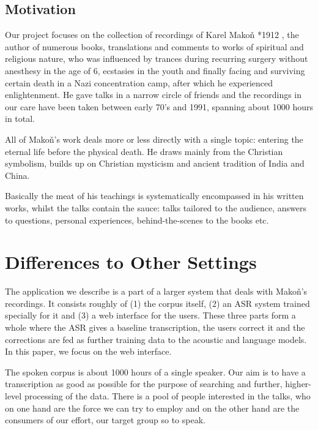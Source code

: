 \documentclass{svproc}
\begin{document}
\subsection{Motivation}

Our project focuses on the collection of recordings of Karel
Mako\v{n}\cite{hajek2007cesky} *1912 , the author of numerous
books, translations and comments to works of spiritual and religious nature, who
was influenced by trances during recurring surgery without anesthesy in the age
of 6, ecstasies in the youth and finally facing and surviving certain death in a
Nazi concentration camp, after which he experienced enlightenment. He gave talks
in a narrow circle of friends and the recordings in our care have been taken
between early 70's and 1991, spanning about 1000 hours in total.

All of Mako\v{n}'s work deals more or less directly with a single topic:
entering the eternal life before the physical death. He draws mainly from the
Christian symbolism, builds up on Christian mysticism and ancient tradition of
India and China.

Basically the meat of his teachings is systematically encompassed in his written
works, whilst the talks contain the sauce: talks tailored to the audience,
answers to questions, personal experiences, behind-the-scenes to the books etc.

\section{Differences to Other Settings}


The application we describe is a part of a larger system that deals with
Mako\v{n}'s recordings. It consists roughly of (1) the corpus itself, (2) an ASR
system trained specially for it and (3) a web interface for the users. These
three parts form a whole where the ASR gives a baseline transcription, the users
correct it and the corrections are fed as further training data to the acoustic
and language models. In this paper, we focus on the web interface.

The spoken corpus is about 1000 hours of a single
speaker. Our aim is to have a transcription as good as possible for the purpose
of searching and further, higher-level processing of the data. There is a pool
of people interested in the talks, who on one hand are the force we can try to
employ and on the other hand are the consumers of our effort, our target group
so to speak.
\end{document}
